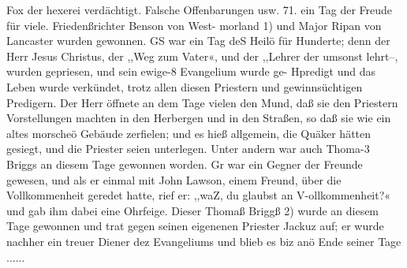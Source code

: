 Fox der hexerei verdächtigt. Falsche Offenbarungen usw. 71.
ein Tag der Freude für viele. Friedenßrichter Benson von West-
morland 1) und Major Ripan von Lancaster wurden gewonnen.
GS war ein Tag deS Heilö für Hunderte; denn der Herr Jesus
Christus, der ,,Weg zum Vater«, und der ,,Lehrer der umsonst
lehrt--, wurden gepriesen, und sein ewige-8 Evangelium wurde ge-
Hpredigt und das Leben wurde verkündet, trotz allen diesen Priestern
und gewinnsüchtigen Predigern. Der Herr öffnete an dem Tage
vielen den Mund, daß sie den Priestern Vorstellungen machten
in den Herbergen und in den Straßen, so daß sie wie ein altes
morscheö Gebäude zerfielen; und es hieß allgemein, die Quäker
hätten gesiegt, und die Priester seien unterlegen. Unter andern
war auch Thoma-3 Briggs an diesem Tage gewonnen worden. Gr
war ein Gegner der Freunde gewesen, und als er einmal mit
John Lawson, einem Freund, über die Vollkommenheit geredet hatte,
rief er: ,,waZ, du glaubst an V-ollkommenheit?« und gab ihm dabei
eine Ohrfeige. Dieser Thomaß Briggß 2) wurde an diesem Tage
gewonnen und trat gegen seinen eigenenen Priester Jackuz auf; er
wurde nachher ein treuer Diener dez Evangeliums und blieb es
biz anö Ende seiner Tage ......

